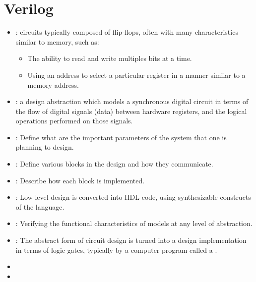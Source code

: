 \chapter{Verilog}

  \begin{itemize}
    \item {}: circuits typically composed of flip-flops,
      often with many characteristics similar to memory, such as:
      \begin{itemize}
        \item The ability to read and write multiples bits at a time.
        \item Using an address to select a particular register in a manner
          similar to a memory address.
      \end{itemize}
    \item {}: a design abstraction which
      models a synchronous digital circuit in terms of the flow of digital
      signals (data) between hardware registers, and the logical operations
      performed on those signals.
  \end{itemize}

  \begin{itemize}
    \item {}: Define what are the important parameters of the
      system that one is planning to design.
    \item {}: Define various blocks in the design and how
      they communicate.
    \item {}: Describe how each block is implemented.
    \item {}: Low-level design is converted into HDL code, using
      synthesizable constructs of the language.
    \item {}: Verifying the functional characteristics of models at
      any level of abstraction.
    \item {}: The abstract form of circuit design is turned into a
      design implementation in terms of logic gates, typically by a computer
      program called a .
    \item {}
    \item {}

  \end{itemize}

